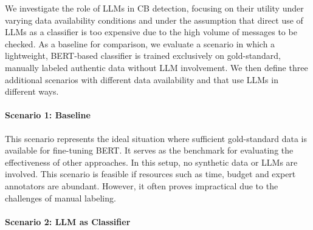 We investigate the role of LLMs in CB detection, focusing on their utility under varying data availability conditions
and under the assumption that direct use of LLMs as a classifier is too expensive due to the high volume of messages to be checked.
As a baseline for comparison, we %
evaluate a scenario in which a
lightweight, BERT-based
classifier is trained exclusively on gold-standard, manually labeled authentic data without %
LLM involvement.
We then define three additional scenarios with different data availability
and that use LLMs in different ways.


\paragraph{Scenario 1: Baseline}

This scenario represents the ideal situation where sufficient
gold-standard data is available for fine-tuning %
BERT.
It serves as the benchmark for evaluating the effectiveness of other approaches.
In this setup, no synthetic data or LLMs are involved.
This scenario is feasible if resources such as time, budget and expert annotators are abundant. However, it often proves impractical due to the
challenges of manual labeling.



\paragraph{Scenario 2: LLM as Classifier}  \label{s:m:sc2}

